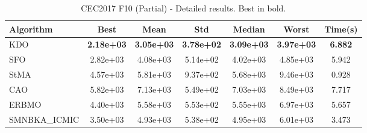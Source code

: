 \begin{table}[H]
\centering\small
\caption{CEC2017 F10 (Partial) - Detailed results. Best in bold.}
\label{tab:cec2017_F10}
\begin{tabular}{lcccccc}
\toprule
\textbf{Algorithm} & \textbf{Best} & \textbf{Mean} & \textbf{Std} & \textbf{Median} & \textbf{Worst} & \textbf{Time(s)} \\
\midrule
KDO & \textbf{2.18e+03} & \textbf{3.05e+03} & \textbf{3.78e+02} & \textbf{3.09e+03} & \textbf{3.97e+03} & \textbf{6.882} \\
SFO & 2.82e+03 & 4.08e+03 & 5.14e+02 & 4.02e+03 & 4.85e+03 & 5.942 \\
StMA & 4.57e+03 & 5.81e+03 & 9.37e+02 & 5.68e+03 & 9.46e+03 & 0.928 \\
CAO & 5.82e+03 & 7.13e+03 & 5.49e+02 & 7.03e+03 & 8.49e+03 & 7.717 \\
ERBMO & 4.40e+03 & 5.58e+03 & 5.53e+02 & 5.55e+03 & 6.97e+03 & 5.657 \\
SMNBKA_ICMIC & 3.50e+03 & 4.93e+03 & 5.38e+02 & 4.95e+03 & 6.01e+03 & 3.473 \\
\bottomrule
\end{tabular}
\end{table}
